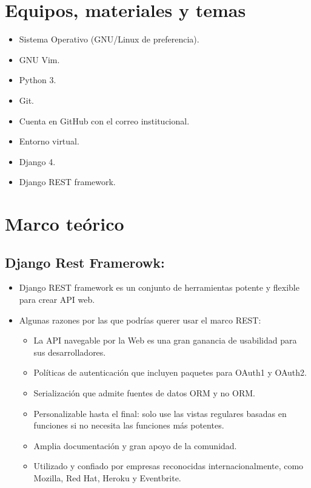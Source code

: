 \documentclass{article}
\begin{document}
	\section{Equipos, materiales y temas}
	
	\begin{itemize}
		\item Sistema Operativo (GNU/Linux de preferencia).
		\item GNU Vim.
		\item Python 3.
		\item Git.
		\item Cuenta en GitHub con el correo institucional.
		\item Entorno virtual.
		\item Django 4.
		\item Django REST framework.
	\end{itemize}
	
	\section{Marco teórico}
	
	\subsection{Django Rest Framerowk:}
	
	\begin{itemize}
		\item Django REST framework es un conjunto de herramientas potente y flexible para crear API web.
		\item Algunas razones por las que podrías querer usar el marco REST:
		
		\begin{itemize}
			\item La API navegable por la Web es una gran ganancia de usabilidad para sus desarrolladores.
			\item Políticas de autenticación que incluyen paquetes para OAuth1 y OAuth2.
			\item Serialización que admite fuentes de datos ORM y no ORM.
			\item Personalizable hasta el final: solo use las vistas regulares basadas en funciones si no necesita las funciones más potentes.
			\item Amplia documentación y gran apoyo de la comunidad.
			\item Utilizado y confiado por empresas reconocidas internacionalmente, como Mozilla, Red Hat, Heroku y Eventbrite.
		\end{itemize}
		
	\end{itemize}
	
\end{document}
